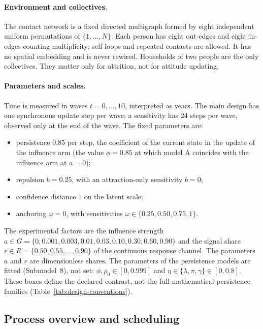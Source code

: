 \paragraph{Environment and collectives.}
The contact network is a fixed directed multigraph formed by eight independent uniform permutations of $\{1,\ldots,N\}$. Each person has eight out-edges and eight in-edges counting multiplicity; self-loops and repeated contacts are allowed. It has no spatial embedding and is never rewired. Households of two people are the only collectives. They matter only for attrition, not for attitude updating.

\paragraph{Parameters and scales.}
Time is measured in waves $t=0,\ldots,10$, interpreted as years. The main design has one synchronous update step per wave; a sensitivity has 24 steps per wave, observed only at the end of the wave. The fixed parameters are:
\begin{itemize}
\item persistence 0.85 per step, the coefficient of the current state in the update of the influence arm (the value $\phi=0.85$ at which model A coincides with the influence arm at $a=0$);
\item repulsion $b=0.25$, with an attraction-only sensitivity $b=0$;
\item confidence distance 1 on the latent scale;
\item anchoring $\omega=0$, with sensitivities $\omega\in\{0.25,0.50,0.75,1\}$.
\end{itemize}
The experimental factors are the influence strength $a\in G=\{0,\allowbreak0.001,\allowbreak0.003,\allowbreak0.01,\allowbreak0.03,\allowbreak0.10,\allowbreak0.30,\allowbreak0.60,\allowbreak0.90\}$ and the signal share $r\in R=\{0.50,\allowbreak0.55,\allowbreak\ldots,\allowbreak0.90\}$ of the continuous response channel. The parameters $a$ and $r$ are dimensionless shares. The parameters of the persistence models are fitted (Submodel~8), not set: $\phi,\rho_0\in[0,0.999]$ and $\eta\in\{\lambda,\pi,\gamma\}\in[0,0.8]$. These boxes define the declared contrast, not the full mathematical persistence families (Table~\ref{tab:design-conventions}).

\subsection{Process overview and scheduling}

